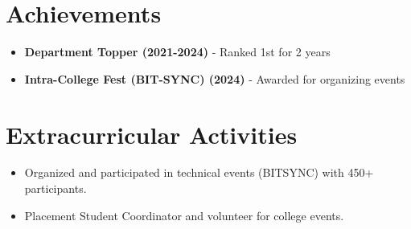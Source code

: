 \documentclass[11pt]{article}
\begin{document}
\section{Achievements}
\begin{itemize}
    \item[\faCertificate] \textbf{Department Topper (2021-2024)} - Ranked 1st for 2 years
    \item[\faTrophy] \textbf{Intra-College Fest (BIT-SYNC) (2024)} - Awarded for organizing events
\end{itemize}


\section{Extracurricular Activities}
\begin{itemize}
    \item Organized and participated in technical events (BITSYNC) with 450+ participants.
    \item Placement Student Coordinator and volunteer for college events.
\end{itemize}
\end{document}
